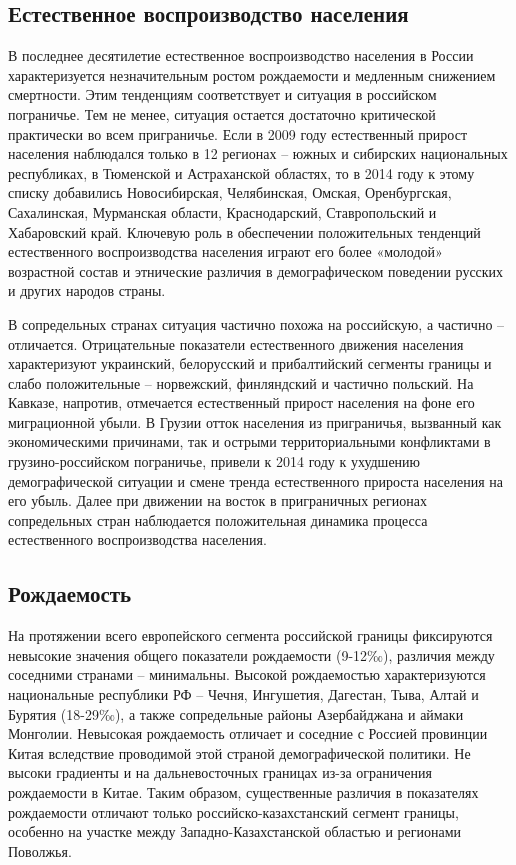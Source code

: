 \documentclass[]{book}
\begin{document}
\hypertarget{demo-situ-re}{%
\subsection{Естественное воспроизводство населения}\label{demo-situ-re}}

В последнее десятилетие естественное воспроизводство населения в России
характеризуется незначительным ростом рождаемости и медленным снижением
смертности. Этим тенденциям соответствует и ситуация в российском
пограничье. Тем не менее, ситуация остается достаточно критической
практически во всем приграничье. Если в 2009 году естественный прирост
населения наблюдался только в 12 регионах -- южных и сибирских
национальных республиках, в Тюменской и Астраханской областях, то в 2014
году к этому списку добавились Новосибирская, Челябинская, Омская,
Оренбургская, Сахалинская, Мурманская области, Краснодарский,
Ставропольский и Хабаровский край. Ключевую роль в обеспечении
положительных тенденций естественного воспроизводства населения играют
его более «молодой» возрастной состав и этнические различия в
демографическом поведении русских и других народов страны.

В сопредельных странах ситуация частично похожа на российскую, а
частично -- отличается. Отрицательные показатели естественного движения
населения характеризуют украинский, белорусский и прибалтийский сегменты
границы и слабо положительные -- норвежский, финляндский и частично
польский. На Кавказе, напротив, отмечается естественный прирост
населения на фоне его миграционной убыли. В Грузии отток населения из
приграничья, вызванный как экономическими причинами, так и острыми
территориальными конфликтами в грузино-российском пограничье, привели к
2014 году к ухудшению демографической ситуации и смене тренда
естественного прироста населения на его убыль. Далее при движении на
восток в приграничных регионах сопредельных стран наблюдается
положительная динамика процесса естественного воспроизводства населения.

\hypertarget{demo-situ-bir}{%
\subsection{Рождаемость}\label{demo-situ-bir}}

На протяжении всего европейского сегмента российской границы фиксируются
невысокие значения общего показатели рождаемости (9-12‰), различия между
соседними странами -- минимальны. Высокой рождаемостью характеризуются
национальные республики РФ -- Чечня, Ингушетия, Дагестан, Тыва, Алтай и
Бурятия (18-29‰), а также сопредельные районы Азербайджана и аймаки
Монголии. Невысокая рождаемость отличает и соседние с Россией провинции
Китая вследствие проводимой этой страной демографической политики. Не
высоки градиенты и на дальневосточных границах из-за ограничения
рождаемости в Китае. Таким образом, существенные различия в показателях
рождаемости отличают только российско-казахстанский сегмент границы,
особенно на участке между Западно-Казахстанской областью и регионами
Поволжья.
\end{document}
